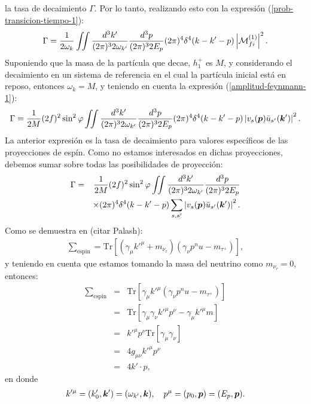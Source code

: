 la tasa de decaimiento $\Gamma$. Por lo tanto, realizando esto con la expresión (\ref{prob-transicion-tiempo-1}):
\begin{eqnarray*}
\Gamma=\frac{1}{2\omega_k}\iint\frac{d^3k'}{(2\pi)^32\omega_{k'}}\frac{d^3p}{(2\pi)^32E_p}
(2\pi)^4\delta^4(k-k'-p)\left|\mathcal{M}_{fi}^{(1)}\right|^2.
\end{eqnarray*}
Suponiendo que la masa de la partícula que decae, $h_1^+$ es $M$, y considerando el decaimiento en un sistema de referencia en el
cual la partícula inicial está en reposo, entonces $\omega_k=M$, y teniendo en cuenta la expresión (\ref{amplitud-feynmann-1}):
\begin{eqnarray}\label{tasa-decaimiento-1}
\Gamma=\frac{1}{2M}(2f)^2\sin^2\varphi\iint\frac{d^3k'}{(2\pi)^32\omega_{k'}}\frac{d^3p}{(2\pi)^32E_p}
(2\pi)^4\delta^4(k-k'-p)\left|v_s(\boldsymbol{p})\bar{u}_{s'}(\boldsymbol{k}')\right|^2.
\end{eqnarray}
La anterior expresión es la tasa de decaimiento para valores específicos de las proyecciones de espín. Como no estamos
interesados en dichas proyecciones, debemos sumar sobre todas las posibilidades de proyección:
\begin{eqnarray}\label{tasa-decaimiento-2}
\Gamma&=&\frac{1}{2M}(2f)^2\sin^2\varphi\iint\frac{d^3k'}{(2\pi)^32\omega_{k'}}\frac{d^3p}{(2\pi)^32E_p} \nonumber \\
& &\times(2\pi)^4\delta^4(k-k'-p)\sum_{s,s'}\left|v_s(\boldsymbol{p})\bar{u}_{s'}(\boldsymbol{k}')\right|^2.
\end{eqnarray}
Como se demuestra en (citar Palash):
\begin{eqnarray*}
\sum_{\mbox{espin}}=\mbox{Tr}\left[(\gamma_\mu k'^\mu+m_{\nu_\tau})(\gamma_\nu p^nu-m_{\tau^+})\right],
\end{eqnarray*}
y teniendo en cuenta que estamos tomando la masa del neutrino como $m_{\nu_\tau}=0$, entonces:
\begin{eqnarray*}
\sum_{\mbox{espin}}&=&\mbox{Tr}\left[\gamma_\mu k'^\mu(\gamma_\nu p^nu-m_{\tau^+})\right]\\
&=&\mbox{Tr}[\gamma_\mu\gamma_\nu k'^\mu p^\nu-\gamma_\mu k'^\mu m] \\
&=&k'^\mu p^\nu\mbox{Tr}[\gamma_\mu\gamma_\nu]\\
&=&4g_{\mu\nu}k'^\mu p^\nu \\
&=&4k'\cdot p,
\end{eqnarray*}
en donde
\begin{eqnarray*}
k'^\mu=(k'_0,\boldsymbol{k}')=(\omega_{k'},\boldsymbol{k}), \quad p^\mu=(p_0,\boldsymbol{p})=(E_p,\boldsymbol{p}).
\end{eqnarray*}

